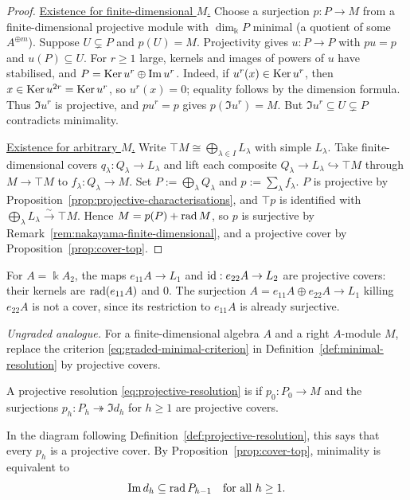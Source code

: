 \begin{advanced}
\begin{proof}
\underline{Existence for finite-dimensional $M$.}
Choose a surjection $p:P\to M$ from a finite-dimensional projective module with $\dim_\Bbbk P$ minimal (a quotient of some $A^{\oplus m}$).
Suppose $U\subsetneq P$ and $p(U)=M$.
Projectivity gives $u:P\to P$ with $pu=p$ and $u(P)\subseteq U$.
For $r\geq1$ large, kernels and images of powers of $u$ have stabilised, and $P=\operatorname{Ker}\nolimits u^r\oplus\operatorname{Im}\nolimits u^r$.
Indeed, if $u^r(x)\in\operatorname{Ker}\nolimits u^r$, then $x\in\operatorname{Ker}\nolimits u^{2r}=\operatorname{Ker}\nolimits u^r$, so $u^r(x)=0$; equality follows by the dimension formula.
Thus $\Im u^r$ is projective, and $pu^r=p$ gives $p(\Im u^r)=M$.
But $\Im u^r\subseteq U\subsetneq P$ contradicts minimality.

\underline{Existence for arbitrary $M$.}
Write $\top M\cong\bigoplus_{\lambda\in I}L_\lambda$ with simple $L_\lambda$.
Take finite-dimensional covers $q_\lambda:Q_\lambda\to L_\lambda$ and lift each composite $Q_\lambda\to L_\lambda\hookrightarrow\top M$ through $M\to\top M$ to $f_\lambda:Q_\lambda\to M$.
Set $P:=\bigoplus_\lambda Q_\lambda$ and $p:=\sum_\lambda f_\lambda$.
$P$ is projective by Proposition~\ref{prop:projective-characterisations}, and $\top p$ is identified with $\bigoplus_\lambda L_\lambda\xrightarrow{\sim}\top M$.
Hence $M=p(P)+\operatorname{rad}\nolimits M$, so $p$ is surjective by Remark~\ref{rem:nakayama-finite-dimensional}, and a projective cover by Proposition~\ref{prop:cover-top}.
\end{proof}

\begin{example}\label{ex:ordinary-A2-covers}
For $A=\Bbbk A_2$, the maps $e_{11}A\to L_1$ and $\operatorname{id}:e_{22}A\to L_2$ are projective covers: their kernels are $\operatorname{rad}\nolimits(e_{11}A)$ and $0$.
The surjection $A=e_{11}A\oplus e_{22}A\to L_1$ killing $e_{22}A$ is not a cover, since its restriction to $e_{11}A$ is already surjective.
\end{example}

\emph{Ungraded analogue.}
For a finite-dimensional algebra $A$ and a right $A$-module $M$, replace the criterion \eqref{eq:graded-minimal-criterion} in Definition~\ref{def:minimal-resolution} by projective covers.

\begin{definition}\label{def:ordinary-minimal-resolution}
A projective resolution \eqref{eq:projective-resolution} is  if $p_0:P_0\to M$ and the surjections $p_h:P_h\twoheadrightarrow\Im d_h$ for $h\geq1$ are projective covers.
\end{definition}

In the diagram following Definition~\ref{def:projective-resolution}, this says that every $p_h$ is a projective cover.
By Proposition~\ref{prop:cover-top}, minimality is equivalent to
\begin{equation}\label{eq:ordinary-minimal-criterion}
\operatorname{Im}\nolimits d_h\subseteq \operatorname{rad}\nolimits P_{h-1}\quad\text{for all }h\geq1.
\end{equation}


\end{advanced}
